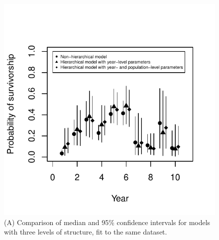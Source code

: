 \documentclass[12pt, oneside, titlepage]{article}   	%
\begin{document}
 \begin{figure}[h]
   \centering
       \includegraphics[page=1,width=.9\textwidth]{../figures/appendix-x-hierarchyPosteriorsSummary}  
    \caption{ (A) Comparison of median and 95\% confidence intervals for models with three levels of structure, fit to the same dataset.   }
 \label{fig:hierarchyPosteriorsSummary}
\end{figure}
\end{document}

